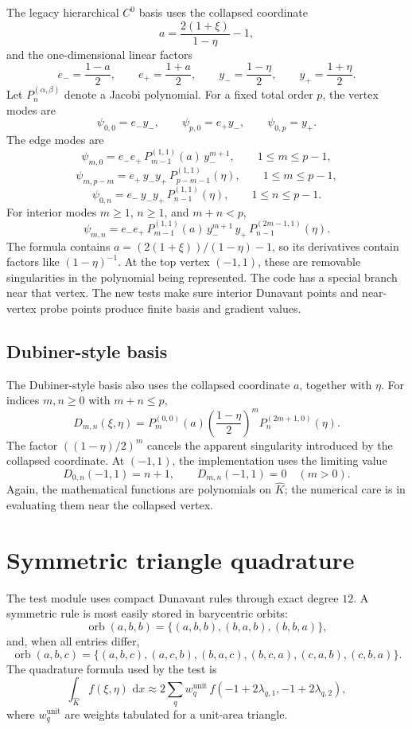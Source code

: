 \documentclass[11pt]{article}
\newcommand{\Khat}{\widehat K}
\newcommand{\dd}{\,\mathrm d}
\newcommand{\lam}{\lambda}
\begin{document}
The legacy hierarchical \(C^0\) basis uses the collapsed coordinate
\[
  a = \frac{2(1+\xi)}{1-\eta}-1,
\]
and the one-dimensional linear factors
\[
  e_-=\frac{1-a}{2},\qquad e_+=\frac{1+a}{2},\qquad
  y_-=\frac{1-\eta}{2},\qquad y_+=\frac{1+\eta}{2}.
\]
Let \(P_n^{(\alpha,\beta)}\) denote a Jacobi polynomial.  For a fixed total
order \(p\), the vertex modes are
\[
  \psi_{0,0}=e_-y_-,
  \qquad
  \psi_{p,0}=e_+y_-,
  \qquad
  \psi_{0,p}=y_+.
\]
The edge modes are
\[
  \psi_{m,0}
  =
  e_-e_+\,P_{m-1}^{(1,1)}(a)\,y_-^{m+1},
  \qquad 1\le m\le p-1,
\]
\[
  \psi_{m,p-m}
  =
  e_+\,y_-y_+\,P_{p-m-1}^{(1,1)}(\eta),
  \qquad 1\le m\le p-1,
\]
\[
  \psi_{0,n}
  =
  e_-\,y_-y_+\,P_{n-1}^{(1,1)}(\eta),
  \qquad 1\le n\le p-1.
\]
For interior modes \(m\ge1\), \(n\ge1\), and \(m+n<p\),
\[
  \psi_{m,n}
  =
  e_-e_+\,P_{m-1}^{(1,1)}(a)\,
  y_-^{m+1}\,y_+\,
  P_{n-1}^{(2m-1,1)}(\eta).
\]
The formula contains \(a=(2(1+\xi))/(1-\eta)-1\), so its derivatives contain
factors like \((1-\eta)^{-1}\).  At the top vertex \((-1,1)\), these are
removable singularities in the polynomial being represented.  The code has a
special branch near that vertex.  The new tests make sure interior Dunavant
points and near-vertex probe points produce finite basis and gradient values.

\subsection{Dubiner-style basis}

The Dubiner-style basis also uses the collapsed coordinate \(a\), together
with \(\eta\).  For indices \(m,n\ge0\) with \(m+n\le p\),
\[
  D_{m,n}(\xi,\eta)
  =
  P_m^{(0,0)}(a)
  \left(\frac{1-\eta}{2}\right)^m
  P_n^{(2m+1,0)}(\eta).
\]
The factor \(((1-\eta)/2)^m\) cancels the apparent singularity introduced by
the collapsed coordinate.  At \((-1,1)\), the implementation uses the limiting
value
\[
  D_{0,n}(-1,1)=n+1,\qquad D_{m,n}(-1,1)=0\quad(m>0).
\]
Again, the mathematical functions are polynomials on \(\Khat\); the numerical
care is in evaluating them near the collapsed vertex.

\section{Symmetric triangle quadrature}

The test module uses compact Dunavant rules through exact degree \(12\).  A
symmetric rule is most easily stored in barycentric orbits:
\[
  \operatorname{orb}(a,b,b)
  =
  \{(a,b,b),(b,a,b),(b,b,a)\},
\]
and, when all entries differ,
\[
  \operatorname{orb}(a,b,c)
  =
  \{(a,b,c),(a,c,b),(b,a,c),(b,c,a),(c,a,b),(c,b,a)\}.
\]
The quadrature formula used by the test is
\[
  \int_{\Khat} f(\xi,\eta)\,\dd x
  \approx
  2\sum_q w_q^{\mathrm{unit}}\,
  f\!\left(-1+2\lam_{q,1},-1+2\lam_{q,2}\right),
\]
where \(w_q^{\mathrm{unit}}\) are weights tabulated for a unit-area triangle.
\end{document}
